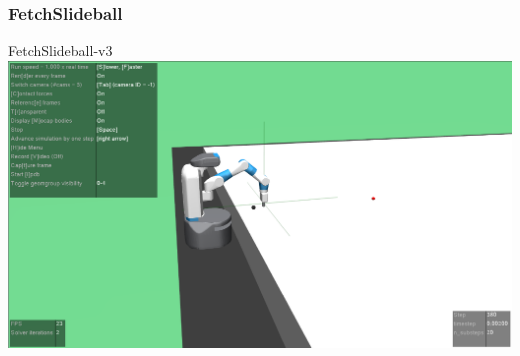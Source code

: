 




\begin{frame}
	\frametitle{FetchSlideball}	
	\vspace{1cm}
	
	FetchSlideball-v3
	\includegraphics[width=\textwidth, height=.55\textheight]{./Ressourcen/Figures/FetchSlideball-v3.pdf}
	
	
\end{frame}
\clearpage








